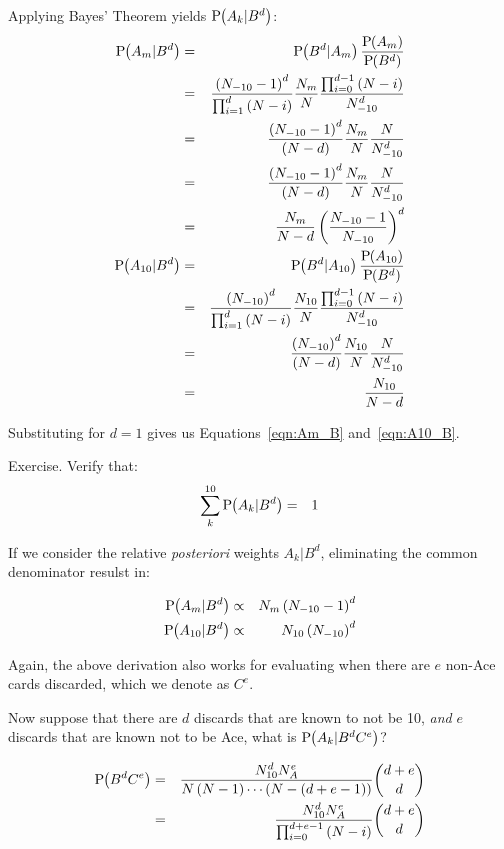 \noindent
Applying Bayes' Theorem yields $\textrm{P}\hspace{-.5ex}\left(A_k|B^d\right)$:
\begin{eqnarray}
\textrm{P}\hspace{-.5ex}\left(A_m|B^d\right) &=& \textrm{P}\hspace{-.5ex}\left(B^d|A_m\right)\frac{\textrm{P}\hspace{-.5ex}\left(A_m\right)}{\textrm{P}\hspace{-.5ex}\left(B^d\right)} \nonumber \\
&=& \frac{\left(N_{-10}-1\right)^d}{\prod_{i=1}^{d}{\left(N-i\right)}}
\frac{N_m}{N} \frac{\prod_{i=0}^{d-1}{\left(N-i\right)}}{N_{-10}^d} \nonumber \\
&=& \frac{\left(N_{-10}-1\right)^d}{\left(N-d\right)}
\frac{N_m}{N} \frac{N}{N_{-10}^d} \nonumber \\
&=& \frac{\left(N_{-10}-1\right)^d}{\left(N-d\right)}
\frac{N_m}{N} \frac{N}{N_{-10}^d} \nonumber \\
&=& \frac{N_m}{N-d} \left(\frac{N_{-10}-1}{N_{-10}}\right)^d \label{eqn:Am_Bd} \\
\textrm{P}\hspace{-.5ex}\left(A_{10}|B^d\right) &=& \textrm{P}\hspace{-.5ex}\left(B^d|A_{10}\right)\frac{\textrm{P}\hspace{-.5ex}\left(A_{10}\right)}{\textrm{P}\hspace{-.5ex}\left(B^d\right)} \nonumber \\
&=& \frac{\left(N_{-10}\right)^d}{\prod_{i=1}^{d}{\left(N-i\right)}}
\frac{N_{10}}{N} \frac{\prod_{i=0}^{d-1}{\left(N-i\right)}}{N_{-10}^d} \nonumber \\
&=& \frac{\left(N_{-10}\right)^d}{\left(N-d\right)}
\frac{N_{10}}{N} \frac{N}{N_{-10}^d} \nonumber \\
&=& \frac{N_{10}}{N-d} \label{eqn:A10_Bd}
\end{eqnarray}

\noindent
Substituting for $d=1$ gives us Equations~\ref{eqn:Am_B} and~\ref{eqn:A10_B}.

Exercise.
Verify that:
\begin{eqnarray}
\sum_{k}^{10}{\textrm{P}\hspace{-.5ex}\left(A_k|B^d\right)} &=& 1
\end{eqnarray}

If we consider the relative \emph{posteriori} weights $A_k|B^d$, 
eliminating the common denominator resulst in:

\begin{eqnarray}
\textrm{P}\hspace{-.5ex}\left(A_m|B^d\right) &\propto& N_m \left(N_{-10}-1\right)^d \\
\textrm{P}\hspace{-.5ex}\left(A_{10}|B^d\right) &\propto& N_{10} \left(N_{-10}\right)^d
\end{eqnarray}

Again, the above derivation also works for evaluating
when there are $e$ non-Ace cards discarded,
which we denote as $C^e$.

Now suppose that there are $d$ discards that are known to not be 10,
\emph{and} $e$ discards that are known not to be Ace, 
what is $\textrm{P}\hspace{-.5ex}\left(A_k|B^d C^e\right)$?

\begin{eqnarray}
\textrm{P}\hspace{-.5ex}\left(B^d C^e\right) &=& \frac{N_{10}^d N_A^e}{N \left(N-1\right) \cdots \left(N-\left(d+e-1\right)\right)} \binom{d+e}{d} \nonumber \\
&=& \frac{N_{10}^d N_A^e}{\prod_{i=0}^{d+e-1}{\left(N-i\right)}} \binom{d+e}{d}
\end{eqnarray}


